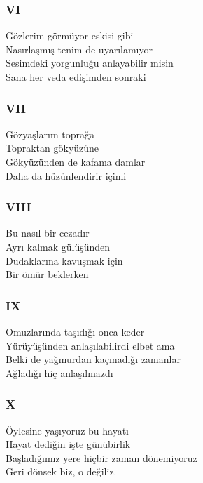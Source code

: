 \subsubsection{VI}
Gözlerim görmüyor eskisi gibi \\
Nasırlaşmış tenim de uyarılamıyor \\
Sesimdeki yorgunluğu anlayabilir misin \\
Sana her veda edişimden sonraki \\

\subsubsection{VII}
Gözyaşlarım toprağa \\
Topraktan gökyüzüne \\
Gökyüzünden de kafama damlar \\
Daha da hüzünlendirir içimi \\

\subsubsection{VIII}
Bu nasıl bir cezadır \\
Ayrı kalmak gülüşünden \\
Dudaklarına kavuşmak için \\
Bir ömür beklerken \\

\subsubsection{IX}
Omuzlarında taşıdığı onca keder \\
Yürüyüşünden anlaşılabilirdi elbet ama \\
Belki de yağmurdan kaçmadığı zamanlar \\
Ağladığı hiç anlaşılmazdı \\

\subsubsection{X}
Öylesine yaşıyoruz bu hayatı \\
Hayat dediğin işte günübirlik \\
Başladığımız yere hiçbir zaman dönemiyoruz \\
Geri dönsek biz, o değiliz. \\